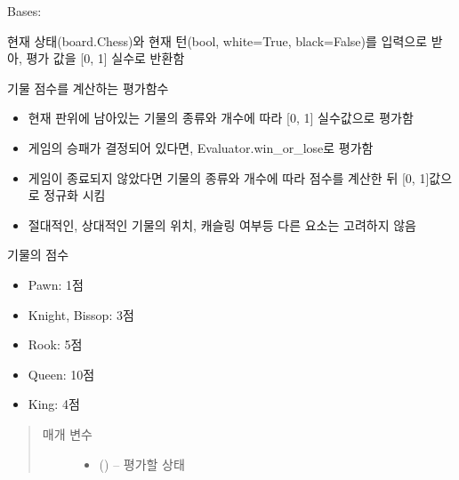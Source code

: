 \documentclass[letterpaper,10pt,english]{sphinxmanual}
\begin{document}

\begin{fulllineitems}
\label{\detokenize{scripts:scripts.run_game.Evaluator}}
Bases: 


현재 상태(board.Chess)와 현재 턴(bool, white=True, black=False)를 입력으로 받아,
평가 값을 {[}0, 1{]} 실수로 반환함

\begin{fulllineitems}
\label{\detokenize{scripts:scripts.run_game.Evaluator.eval}}
기물 점수를 계산하는 평가함수
\begin{itemize}
\item {} 
현재 판위에 남아있는 기물의 종류와 개수에 따라 {[}0, 1{]} 실수값으로 평가함

\item {} 
게임의 승패가 결정되어 있다면, Evaluator.win\_or\_lose로 평가함

\item {} 
게임이 종료되지 않았다면 기물의 종류와 개수에 따라 점수를 계산한 뒤 {[}0, 1{]}값으로 정규화 시킴

\item {} 
절대적인, 상대적인 기물의 위치, 캐슬링 여부등 다른 요소는 고려하지 않음

\end{itemize}

기물의 점수
\begin{itemize}
\item {} 
Pawn: 1점

\item {} 
Knight, Bissop: 3점

\item {} 
Rook: 5점

\item {} 
Queen: 10점

\item {} 
King: 4점

\end{itemize}
\begin{quote}\begin{description}
\item[{매개 변수}] \leavevmode\begin{itemize}
\item {} 
 ({\hyperref[\detokenize{scripts:scripts.run_game.State}]{}}) -- 평가할 상태


\end{itemize}
\end{description}
\end{quote}
\end{fulllineitems}
\end{fulllineitems}
\end{document}
